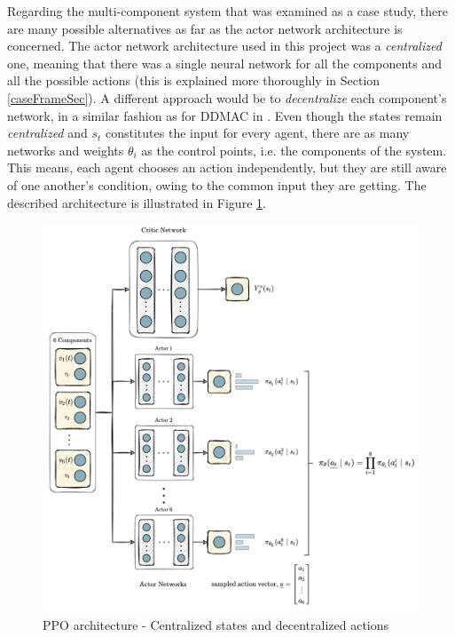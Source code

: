 Regarding the multi-component system that was examined as a case study, there are many possible alternatives as far as the actor network architecture is concerned. The actor network architecture used in this project was a \textit{centralized} one, meaning that there was a single neural network for all the components and all the possible actions (this is explained more thoroughly in Section \ref{caseFrameSec}). A different approach would be to \textit{decentralize} each component's network, in a similar fashion as for \gls{DDMAC} in \cite{andriotis2021deep}. Even though the states remain \textit{centralized} and $s_t$ constitutes the input for every agent, there are as many networks and weights $\theta _i$ as the control points, i.e. the components of the system. This means, each agent chooses an action independently, but they are still aware of one another's condition, owing to the common input they are getting. The described architecture is illustrated in Figure \ref{casePPOnetDecenter}.

\begin{figure}[H]
    \centering
    \includegraphics[width=\textwidth]{Figures/neuralNetDecenter.png}
	\caption{\gls{PPO} architecture - Centralized states and decentralized actions}
	\label{casePPOnetDecenter}
\end{figure}

